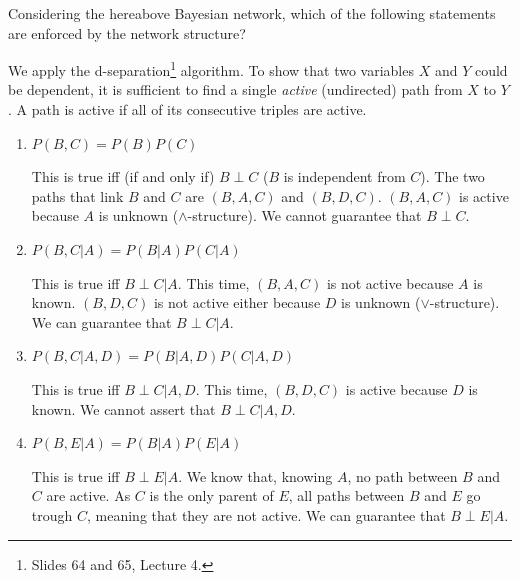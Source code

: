 \documentclass[11pt, a4paper]{article}
\begin{document}
Considering the hereabove Bayesian network, which of the following statements are enforced by the network structure?

\begin{solution}
    We apply the d-separation\footnote{Slides 64 and 65, Lecture 4.} algorithm. To show that two variables $X$ and $Y$ could be dependent, it is sufficient to find a single \emph{active} (undirected) path from $X$ to $Y$. A path is active if all of its consecutive triples are active.
\end{solution}

\begin{enumerate}
    \item $P(B, C) = P(B) P(C)$

    \begin{solution}
        This is true iff (if and only if) $B \perp C$ ($B$ is independent from $C$). The two paths that link $B$ and $C$ are $(B, A, C)$ and $(B, D, C)$. $(B, A, C)$ is active because $A$ is unknown ($\wedge$-structure). We cannot guarantee that $B \perp C$.
    \end{solution}

    \item $P(B, C | A) = P(B | A) P(C | A)$

    \begin{solution}
        This is true iff $B \perp C | A$. This time, $(B, A, C)$ is not active because $A$ is known. $(B, D, C)$ is not active either because $D$ is unknown ($\vee$-structure). We can guarantee that $B \perp C | A$.
    \end{solution}

    \item $P(B, C | A, D) =  P(B | A, D) P(C | A, D)$

    \begin{solution}
        This is true iff $B \perp C | A, D$. This time, $(B, D, C)$ is active because $D$ is known. We cannot assert that $B \perp C | A, D$.
    \end{solution}

    \item $P(B, E | A) = P(B | A) P(E | A)$

    \begin{solution}
        This is true iff $B \perp E | A$. We know that, knowing $A$, no path between $B$ and $C$ are active. As $C$ is the only parent of $E$, all paths between $B$ and $E$ go trough $C$, meaning that they are not active. We can guarantee that $B \perp E | A$.
    \end{solution}


\end{enumerate}
\end{document}
